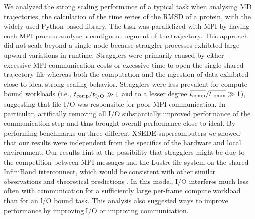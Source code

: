 \label{concl} 
We analyzed the strong scaling performance of a typical task when analysing MD trajectories, the calculation of the time series of the RMSD of a protein, with the widely used Python-based  library.
The task was parallelized with MPI by having each MPI process analyze a contiguous segment of the trajectory.
This approach did not scale beyond a single node because straggler processes exhibited large upward variations in runtime.
Stragglers were primarily caused by either excessive MPI communication costs or excessive time to open the single shared trajectory file whereas both the computation and the ingestion of data exhibited close to ideal strong scaling behavior.
Stragglers were less prevalent for compute-bound workloads (i.e., $\overline{{t}_{\text{comp}}}/\overline{{t}_{\text{I/O}}} \gg 1$ and to a lesser degree $\overline{{t}_{\text{comp}}}/\overline{t_{\text{comm}}} \gg 1$), suggesting that file I/O was responsible for poor MPI communication.
In particular, artifically removing all I/O substantially improved performance of the communication step and thus brought overall performance close to ideal.
By performing benchmarks on three different XSEDE supercomputers we showed that our results were independent from the specifics of the hardware and local environment.
Our results hint at the possibility that stragglers might be due to the competition between MPI messages and the Lustre file system on the shared InfiniBand interconnect, which would be consistent with other similar observations \cite{VMD2013, Kevin2018} and theoretical predictions \cite{Brown:2018ab}.
In this model, I/O interferes much less often with communication for a sufficiently large per-frame compute workload than for an I/O bound task.
This analysis also suggested ways to improve performance by improving I/O or improving communication.

